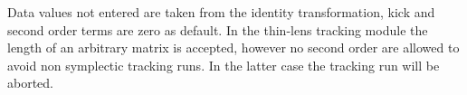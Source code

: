 Data values not entered are taken from the identity transformation, kick
and second order terms are zero as default. In the thin-lens tracking
module the length of an arbitrary matrix is accepted, however no second
order are allowed to avoid non symplectic tracking runs. In the latter
case the tracking run will be aborted.





